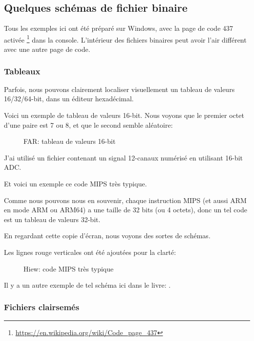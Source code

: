 
\subsection{Quelques schémas de fichier binaire}

Tous les exemples ici ont été préparé sur Windows, avec la page de code 437 activée
\footnote{\url{https://en.wikipedia.org/wiki/Code_page_437}} dans la console.
L'intérieur des fichiers binaires peut avoir l'air différent avec une autre page
de code.

\clearpage
\subsubsection{Tableaux}

Parfois, nous pouvons clairement localiser visuellement un tableau de valeurs 16/32/64-bit,
dans un éditeur hexadécimal.

Voici un exemple de tableau de valeurs 16-bit.
Nous voyons que le premier octet d'une paire est 7 ou 8, et que le second semble
aléatoire:

\begin{figure}[H]
\centering
{}
\caption{FAR: tableau de valeurs 16-bit}
\end{figure}

J'ai utilisé un fichier contenant un signal 12-canaux numérisé en utilisant 16-bit \ac{ADC}.

\clearpage
{}
\par Et voici un exemple ce code MIPS très typique.

Comme nous pouvons nous en souvenir, chaque instruction MIPS (et aussi ARM en mode
ARM ou ARM64) a une taille de 32 bits (ou 4 octets), donc un tel code est un tableau
de valeurs 32-bit.

En regardant cette copie d'écran, nous voyons des sortes de schémas.

Les lignes rouge verticales ont été ajoutées pour la clarté:

\begin{figure}[H]
\centering
{}
\caption{Hiew: code MIPS très typique}
\end{figure}

Il y a un autre exemple de tel schéma ici dans le livre:
.

\clearpage
\subsubsection{Fichiers clairsemés}

